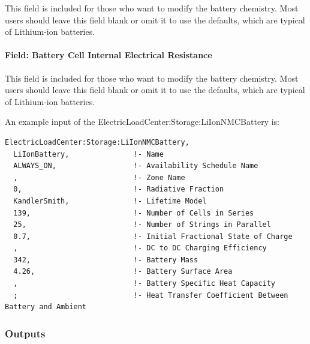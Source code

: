This field is included for those who want to modify the battery chemistry. Most users should leave this field blank or omit it to use the defaults, which are typical of Lithium-ion batteries.

\paragraph{Field: Battery Cell Internal Electrical Resistance}\label{liion-internal-r}

This field is included for those who want to modify the battery chemistry. Most users should leave this field blank or omit it to use the defaults, which are typical of Lithium-ion batteries.

An example input of the ElectricLoadCenter:Storage:LiIonNMCBattery is:

\begin{lstlisting}
ElectricLoadCenter:Storage:LiIonNMCBattery,
  LiIonBattery,               !- Name
  ALWAYS_ON,                  !- Availability Schedule Name
  ,                           !- Zone Name
  0,                          !- Radiative Fraction
  KandlerSmith,               !- Lifetime Model
  139,                        !- Number of Cells in Series
  25,                         !- Number of Strings in Parallel
  0.7,                        !- Initial Fractional State of Charge
  ,                           !- DC to DC Charging Efficiency
  342,                        !- Battery Mass
  4.26,                       !- Battery Surface Area
  ,                           !- Battery Specific Heat Capacity
  ;                           !- Heat Transfer Coefficient Between Battery and Ambient
\end{lstlisting}

\subsubsection{Outputs}\label{electricloadcenter-storageliionnmcbatttery-outputs}


